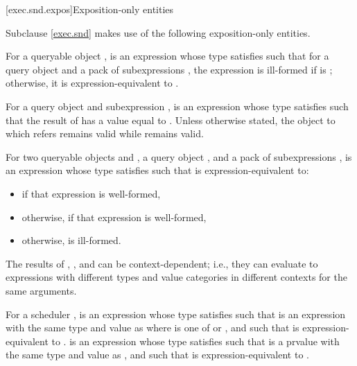 [exec.snd.expos]{Exposition-only entities}

\pnum
Subclause \ref{exec.snd} makes use of the following exposition-only entities.

\pnum
For a queryable object ,
 is an expression
whose type satisfies 
such that for a query object  and
a pack of subexpressions ,
the expression  is ill-formed
if  is ;
otherwise, it is expression-equivalent to .

\pnum
For a query object  and  subexpression ,
 is an expression 
whose type satisfies 
such that the result of  has
a value equal to .
Unless otherwise stated,
the object to which  refers remains valid
while  remains valid.

\pnum
For two queryable objects  and ,
a query object , and
a pack of subexpressions ,
 is an expression 
whose type satisfies 
such that  is expression-equivalent to:
\begin{itemize}
\item
{} if that expression is well-formed,
\item
otherwise,  if that expression is well-formed,
\item
otherwise,  is ill-formed.
\end{itemize}

\pnum
The results of , , and 
can be context-dependent;
i.e., they can evaluate to expressions
with different types and value categories
in different contexts for the same arguments.

\pnum
For a scheduler ,
 is an expression 
whose type satisfies 
such that  is
an expression with the same type and value as 
where  is one of  or , and
such that  is expression-equivalent to
.
 is an expression 
whose type satisfies 
such that  is a prvalue
with the same type and value as , and
such that  is expression-equivalent to
.


